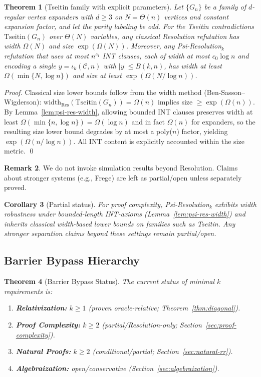 \documentclass[11pt]{article}
\newtheorem{theorem}{Theorem}[section]
\newtheorem{corollary}[theorem]{Corollary}
\theoremstyle{definition}
\newtheorem{remark}[theorem]{Remark}
\begin{document}
\begin{theorem}[Tseitin family with explicit parameters]
Let $\{G_n\}$ be a family of $d$-regular vertex expanders with $d\ge 3$ on $N=\Theta(n)$ vertices and constant expansion factor, and let the parity labeling be odd. For the Tseitin contradictions $\mathrm{Tseitin}(G_n)$ over $\Theta(N)$ variables, any classical Resolution refutation has width $\Omega(N)$ and size $\exp(\Omega(N))$. Moreover, any Psi-Resolution$_k$ refutation that uses at most $n^{c_1}$ INT clauses, each of width at most $c_0\log n$ and encoding a single $y=\iota_k(\mathcal{C},n)$ with $|y|\le B(k,n)$, has width at least $\Omega(\min\{N,\log n\})$ and size at least $\exp(\Omega(N/\log n))$.
\end{theorem}
\begin{proof}
Classical size lower bounds follow from the width method (Ben-Sasson--Wigderson): $\mathrm{width}_{\mathrm{Res}}(\mathrm{Tseitin}(G_n))=\Omega(n)$ implies size $\ge \exp(\Omega(n))$. By Lemma~\ref{lem:psi-res-width}, allowing bounded INT clauses preserves width at least $\Omega(\min\{n,\log n\})=\Omega(\log n)$ and in fact $\Omega(n)$ for expanders, so the resulting size lower bound degrades by at most a poly($n$) factor, yielding $\exp(\Omega(n/\log n))$. All INT content is explicitly accounted within the size metric. \qed
\end{proof}

\begin{remark}
We do not invoke simulation results beyond Resolution. Claims about stronger systems (e.g., Frege) are left as partial/open unless separately proved.
\end{remark}

\begin{corollary}[Partial status]
For proof complexity, Psi-Resolution$_k$ exhibits width robustness under bounded-length INT-axioms (Lemma~\ref{lem:psi-res-width}) and inherits classical width-based lower bounds on families such as Tseitin. Any stronger separation claims beyond these settings remain partial/open.
\end{corollary}

\subsection{Barrier Bypass Hierarchy}

\begin{theorem}[Barrier Bypass Status]
\label{thm:barrier-hierarchy}
The current status of minimal $k$ requirements is:
\begin{enumerate}
\item \textbf{Relativization:} $k \geq 1$ (proven oracle-relative; Theorem~\ref{thm:diagonal}).
\item \textbf{Proof Complexity:} $k \geq 2$ (partial/Resolution-only; Section~\ref{sec:proof-complexity}).
\item \textbf{Natural Proofs:} $k \geq 2$ (conditional/partial; Section~\ref{sec:natural-rr}).
\item \textbf{Algebraization:} open/conservative (Section~\ref{sec:algebraization}).
\end{enumerate}
\end{theorem}
\end{document}

